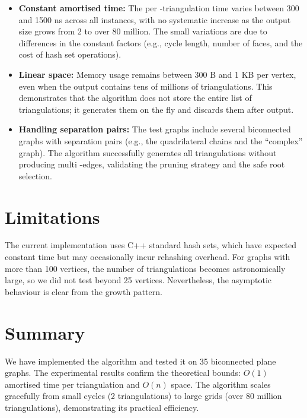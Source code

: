 \begin{itemize}
    \item \textbf{Constant amortised time:} The per -triangulation time varies between 300 and 1500 ns across all instances, with no systematic increase as the output size grows from 2 to over 80 million. 
    The small variations are due to differences in the constant factors (e.g., cycle length, number of faces, and the cost of hash set operations).
    
    \item \textbf{Linear space:} Memory usage remains between 300 B and 1 KB per vertex, even when the output contains tens of millions of triangulations. 
    This demonstrates that the algorithm does not store the entire list of triangulations; it generates them on the fly and discards them after output.
    
    \item \textbf{Handling separation pairs:} The test graphs include several biconnected graphs with separation pairs (e.g., the quadrilateral chains and the “complex” graph). 
    The algorithm successfully generates all triangulations without producing multi -edges, validating the pruning strategy and the safe root selection.
\end{itemize}

\section{Limitations}
\label{sec:limitations_experiment}

The current implementation uses C++ standard hash sets, which have expected constant time but may occasionally incur rehashing overhead. 
For graphs with more than 100 vertices, the number of triangulations becomes astronomically large, so we did not test beyond 25 vertices. 
Nevertheless, the asymptotic behaviour is clear from the growth pattern.

\section{Summary}
\label{sec:experiment_summary}

We have implemented the algorithm and tested it on 35 biconnected plane graphs. 
The experimental results confirm the theoretical bounds: \(O(1)\) amortised time per triangulation and \(O(n)\) space. 
The algorithm scales gracefully from small cycles (2 triangulations) to large grids (over 80 million triangulations), demonstrating its practical efficiency.